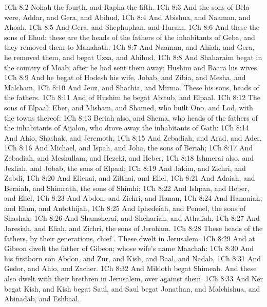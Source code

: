 \vs 1Ch 8:2 Nohah the fourth, and Rapha the fifth.
\vs 1Ch 8:3 And the sons of Bela were, Addar, and Gera, and Abihud,
\vs 1Ch 8:4 And Abishua, and Naaman, and Ahoah,
\vs 1Ch 8:5 And Gera, and Shephuphan, and Huram.
\vs 1Ch 8:6 And these  the sons of Ehud: these are the heads of the fathers of the inhabitants of Geba, and they removed them to Manahath:
\vs 1Ch 8:7 And Naaman, and Ahiah, and Gera, he removed them, and begat Uzza, and Ahihud.
\vs 1Ch 8:8 And Shaharaim begat  in the country of Moab, after he had sent them away; Hushim and Baara  his wives.
\vs 1Ch 8:9 And he begat of Hodesh his wife, Jobab, and Zibia, and Mesha, and Malcham,
\vs 1Ch 8:10 And Jeuz, and Shachia, and Mirma. These  his sons, heads of the fathers.
\vs 1Ch 8:11 And of Hushim he begat Abitub, and Elpaal.
\vs 1Ch 8:12 The sons of Elpaal; Eber, and Misham, and Shamed, who built Ono, and Lod, with the towns thereof:
\vs 1Ch 8:13 Beriah also, and Shema, who  heads of the fathers of the inhabitants of Aijalon, who drove away the inhabitants of Gath:
\vs 1Ch 8:14 And Ahio, Shashak, and Jeremoth,
\vs 1Ch 8:15 And Zebadiah, and Arad, and Ader,
\vs 1Ch 8:16 And Michael, and Ispah, and Joha, the sons of Beriah;
\vs 1Ch 8:17 And Zebadiah, and Meshullam, and Hezeki, and Heber,
\vs 1Ch 8:18 Ishmerai also, and Jezliah, and Jobab, the sons of Elpaal;
\vs 1Ch 8:19 And Jakim, and Zichri, and Zabdi,
\vs 1Ch 8:20 And Elienai, and Zilthai, and Eliel,
\vs 1Ch 8:21 And Adaiah, and Beraiah, and Shimrath, the sons of Shimhi;
\vs 1Ch 8:22 And Ishpan, and Heber, and Eliel,
\vs 1Ch 8:23 And Abdon, and Zichri, and Hanan,
\vs 1Ch 8:24 And Hananiah, and Elam, and Antothijah,
\vs 1Ch 8:25 And Iphedeiah, and Penuel, the sons of Shashak;
\vs 1Ch 8:26 And Shamsherai, and Shehariah, and Athaliah,
\vs 1Ch 8:27 And Jaresiah, and Eliah, and Zichri, the sons of Jeroham.
\vs 1Ch 8:28 These  heads of the fathers, by their generations, chief . These dwelt in Jerusalem.
\vs 1Ch 8:29 And at Gibeon dwelt the father of Gibeon; whose wife's name  Maachah:
\vs 1Ch 8:30 And his firstborn son Abdon, and Zur, and Kish, and Baal, and Nadab,
\vs 1Ch 8:31 And Gedor, and Ahio, and Zacher.
\vs 1Ch 8:32 And Mikloth begat Shimeah. And these also dwelt with their brethren in Jerusalem, over against them.
\vs 1Ch 8:33 And Ner begat Kish, and Kish begat Saul, and Saul begat Jonathan, and Malchishua, and Abinadab, and Eshbaal.

